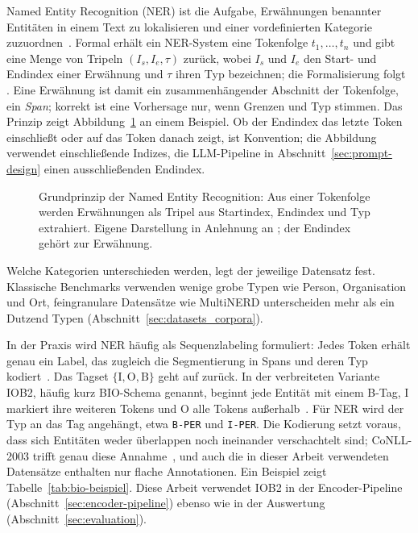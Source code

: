 Named Entity Recognition (NER) ist die Aufgabe, Erwähnungen benannter
Entitäten in einem Text zu lokalisieren und einer vordefinierten
Kategorie zuzuordnen~\cite{li2018survey}.
Formal erhält ein NER-System eine Tokenfolge $t_1, \dots, t_n$ und gibt
eine Menge von Tripeln $(I_s, I_e, \tau)$ zurück, wobei $I_s$ und $I_e$
den Start- und Endindex einer Erwähnung und $\tau$ ihren Typ
bezeichnen; die Formalisierung folgt \textcite{li2018survey}.
Eine Erwähnung ist damit ein zusammenhängender Abschnitt der Tokenfolge,
ein \emph{Span}; korrekt ist eine Vorhersage nur, wenn Grenzen und Typ
stimmen.
Das Prinzip zeigt Abbildung~\ref{fig:ner-grundprinzip} an einem
Beispiel.
Ob der Endindex das letzte Token einschließt oder auf das Token danach
zeigt, ist Konvention; die Abbildung verwendet einschließende Indizes,
die LLM-Pipeline in Abschnitt~\ref{sec:prompt-design} einen
ausschließenden Endindex.

\begin{figure}[htbp]
  \centering
  
  \caption[Grundprinzip der Named Entity Recognition]{Grundprinzip der Named Entity Recognition: Aus einer
  Tokenfolge werden Erwähnungen als Tripel aus Startindex, Endindex und
  Typ extrahiert.
  Eigene Darstellung in Anlehnung an
  \textcite[Abb.~1]{li2018survey}; der Endindex gehört zur Erwähnung.}
  \label{fig:ner-grundprinzip}
\end{figure}

Welche Kategorien unterschieden werden, legt der jeweilige Datensatz
fest.
Klassische Benchmarks verwenden wenige grobe Typen wie Person,
Organisation und Ort, feingranulare Datensätze wie MultiNERD
unterscheiden mehr als ein Dutzend Typen
(Abschnitt~\ref{sec:datasets_corpora}).

In der Praxis wird NER häufig als Sequenzlabeling formuliert: Jedes Token
erhält genau ein Label, das zugleich die Segmentierung in Spans und deren
Typ kodiert~\cite{li2018survey}.
Das Tagset $\{\mathrm{I}, \mathrm{O}, \mathrm{B}\}$ geht auf
\textcite{ramshaw1995text} zurück.
In der verbreiteten Variante IOB2, häufig kurz BIO-Schema genannt,
beginnt jede Entität mit einem B-Tag, I markiert ihre weiteren Tokens
und O alle Tokens außerhalb~\cite{tjong1999representing}.
Für NER wird der Typ an das Tag angehängt, etwa \texttt{B-PER} und
\texttt{I-PER}.
Die Kodierung setzt voraus, dass sich Entitäten weder überlappen noch
ineinander verschachtelt sind; CoNLL-2003 trifft genau diese
Annahme~\cite{sang2003conll}, und auch die in dieser Arbeit verwendeten
Datensätze enthalten nur flache Annotationen.
Ein Beispiel zeigt Tabelle~\ref{tab:bio-beispiel}.
Diese Arbeit verwendet IOB2 in der Encoder-Pipeline
(Abschnitt~\ref{sec:encoder-pipeline}) ebenso wie in der Auswertung
(Abschnitt~\ref{sec:evaluation}).

